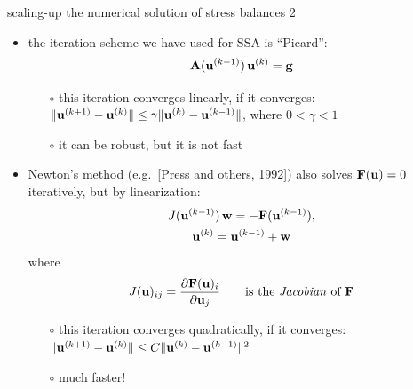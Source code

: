 \begin{frame}{scaling-up the numerical solution of stress balances 2}

\begin{itemize}
\item the iteration scheme we have used for SSA is ``Picard'':
	$$\mathbf{A}(\mathbf{u}^{(k-1)})\,\mathbf{u}^{(k)} = \mathbf{g}$$
\vspace{-0.2in}
  \begin{itemize}
  \item[$\circ$] this iteration converges linearly, if it converges:  $\|\mathbf{u}^{(k+1)} - \mathbf{u}^{(k)}\| \le \gamma \|\mathbf{u}^{(k)} - \mathbf{u}^{(k-1)}\|$, where $0<\gamma<1$
  \item[$\circ$] it can be robust, but it is not fast
  \end{itemize}	
\item Newton's method (e.g.~[Press and others, 1992]) also solves $\mathbf{F}(\mathbf{u}) = 0$ iteratively, but by linearization:
\begin{gather*}
J(\mathbf{u}^{(k-1)})\,\mathbf{w} = - \mathbf{F}(\mathbf{u}^{(k-1)}), \\
\mathbf{u}^{(k)} = \mathbf{u}^{(k-1)} + \mathbf{w}
\end{gather*}
\vspace{-0.1in}
where
   $$J(\mathbf{u})_{ij} = \frac{\partial \mathbf{F}(\mathbf{u})_i}{\partial \mathbf{u}_j} \qquad \text{is the \emph{Jacobian} of } \mathbf{F}$$
\vspace{-0.1in}
  \begin{itemize}
  \item[$\circ$] this iteration converges quadratically, if it converges:  $\|\mathbf{u}^{(k+1)} - \mathbf{u}^{(k)}\| \le C \|\mathbf{u}^{(k)} - \mathbf{u}^{(k-1)}\|^2$
  \item[$\circ$] much faster!
  \end{itemize}	
\end{itemize}
\end{frame}
